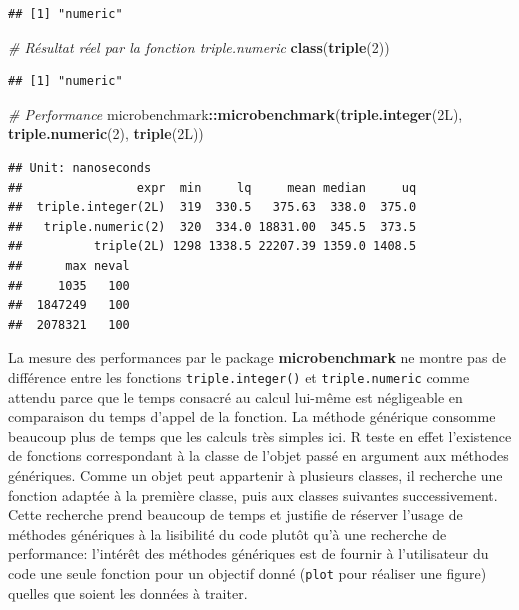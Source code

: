 \documentclass[
  12pt,
  french,
  a4paper,
  extrafontsizes,onecolumn,openright
  ]{memoir}
\newenvironment{Shaded}{\begin{snugshade}}{\end{snugshade}}
\newcommand{\CommentTok}[1]{\textcolor[rgb]{0.56,0.35,0.01}{\textit{#1}}}
\newcommand{\DecValTok}[1]{\textcolor[rgb]{0.00,0.00,0.81}{#1}}
\newcommand{\KeywordTok}[1]{\textcolor[rgb]{0.13,0.29,0.53}{\textbf{#1}}}
\newcommand{\NormalTok}[1]{#1}
\newcommand{\OperatorTok}[1]{\textcolor[rgb]{0.81,0.36,0.00}{\textbf{#1}}}
\newlength{\rf}
\begin{document}
\begin{verbatim}
## [1] "numeric"
\end{verbatim}

\begin{Shaded}
\begin{Highlighting}[]
\CommentTok{# Résultat réel par la fonction triple.numeric}
\KeywordTok{class}\NormalTok{(}\KeywordTok{triple}\NormalTok{(}\DecValTok{2}\NormalTok{))}
\end{Highlighting}
\end{Shaded}

\begin{verbatim}
## [1] "numeric"
\end{verbatim}

\begin{Shaded}
\begin{Highlighting}[]
\CommentTok{# Performance}
\NormalTok{microbenchmark}\OperatorTok{::}\KeywordTok{microbenchmark}\NormalTok{(}\KeywordTok{triple.integer}\NormalTok{(2L), }\KeywordTok{triple.numeric}\NormalTok{(}\DecValTok{2}\NormalTok{), }
    \KeywordTok{triple}\NormalTok{(2L))}
\end{Highlighting}
\end{Shaded}

\begin{verbatim}
## Unit: nanoseconds
##                expr  min     lq     mean median     uq
##  triple.integer(2L)  319  330.5   375.63  338.0  375.0
##   triple.numeric(2)  320  334.0 18831.00  345.5  373.5
##          triple(2L) 1298 1338.5 22207.39 1359.0 1408.5
##      max neval
##     1035   100
##  1847249   100
##  2078321   100
\end{verbatim}

\normalsize

La mesure des performances par le package \textbf{microbenchmark} ne montre pas de différence entre les fonctions \texttt{triple.integer()} et \texttt{triple.numeric} comme attendu parce que le temps consacré au calcul lui-même est négligeable en comparaison du temps d'appel de la fonction.
La méthode générique consomme beaucoup plus de temps que les calculs très simples ici.
R teste en effet l'existence de fonctions correspondant à la classe de l'objet passé en argument aux méthodes génériques.
Comme un objet peut appartenir à plusieurs classes, il recherche une fonction adaptée à la première classe, puis aux classes suivantes successivement.
Cette recherche prend beaucoup de temps et justifie de réserver l'usage de méthodes génériques à la lisibilité du code plutôt qu'à une recherche de performance: l'intérêt des méthodes génériques est de fournir à l'utilisateur du code une seule fonction pour un objectif donné (\texttt{plot} pour réaliser une figure) quelles que soient les données à traiter.
\end{document}
